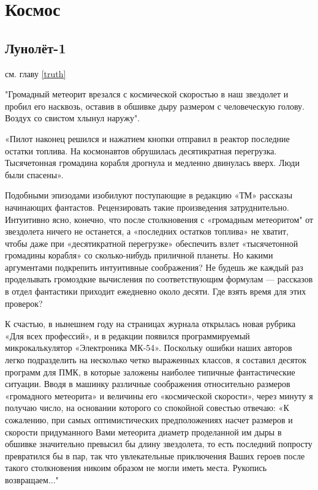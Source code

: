 \documentclass[11pt,a4paper,oneside]{article}
\begin{document}
\newpage
\section{Космос}
\subsection{Лунолёт-1}
см. главу \ref{truth}

"Громадный метеорит врезался с космической скоростью в наш звездолет и пробил его насквозь, оставив в обшивке дыру размером с человеческую голову. Воздух со свистом хлынул наружу".

«Пилот наконец решился и нажатием кнопки отправил в реактор последние остатки топлива. На космонавтов обрушилась десятикратная перегрузка. Тысячетонная громадина корабля дрогнула и медленно двинулась вверх. Люди были спасены».

Подобными эпизодами изобилуют поступающие в редакцию «ТМ» рассказы начинающих фантастов. Рецензировать такие произведения затруднительно. Интуитивно ясно, конечно, что после столкновения с «громадным метеоритом" от звездолета ничего не останется, а «последних остатков топлива» не хватит, чтобы даже при «десятикратной перегрузке» обеспечить взлет «тысячетонной громадины корабля» со сколько-нибудь приличной планеты. Но какими аргументами подкрепить интуитивные соображения? Не будешь же каждый раз проделывать громоздкие вычисления по соответствующим формулам — рассказов в отдел фантастики приходит ежедневно около десяти. Где взять время для этих проверок?

К счастью, в нынешнем году на страницах журнала открылась новая рубрика «Для всех профессий», и в редакции появился программируемый микрокалькулятор «Электроника МК-54». Поскольку ошибки наших авторов легко подразделить на несколько четко выраженных классов, я составил десяток программ для ПМК, в которые заложены наиболее типичные фантастические ситуации. Вводя в машинку различные соображения относительно размеров «громадного метеорита» и величины его «космической скорости», через минуту я получаю число, на основании которого со спокойной совестью отвечаю: «К сожалению, при самых оптимистических предположениях насчет размеров и скорости придуманного Вами метеорита диаметр проделанной им дыры в обшивке значительно превысил бы длину звездолета, то есть последний попросту превратился бы в пар, так что увлекательные приключения Ваших героев после такого столкновения никоим образом не могли иметь места. Рукопись возвращаем..."
\end{document}
